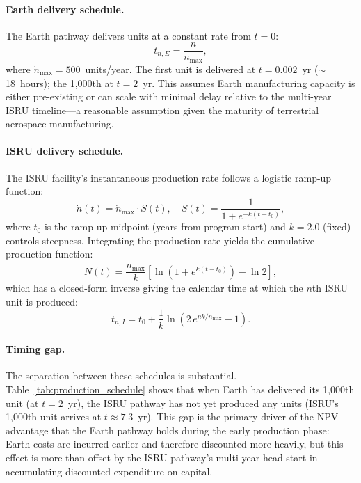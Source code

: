 \documentclass[preprint,12pt]{elsarticle}
\begin{document}
\paragraph{Earth delivery schedule.} The Earth pathway delivers units at a constant rate from $t = 0$:
\begin{equation}
  t_{n,E} = \frac{n}{\dot{n}_{\max}},
  \label{eq:earth_schedule}
\end{equation}
where $\dot{n}_{\max} = 500$~units/year. The first unit is delivered at $t = 0.002$~yr ($\sim$18~hours); the 1{,}000th at $t = 2$~yr. This assumes Earth manufacturing capacity is either pre-existing or can scale with minimal delay relative to the multi-year ISRU timeline---a reasonable assumption given the maturity of terrestrial aerospace manufacturing.

\paragraph{ISRU delivery schedule.} The ISRU facility's instantaneous production rate follows a logistic ramp-up function:
\begin{equation}
  \dot{n}(t) = \dot{n}_{\max} \cdot S(t), \quad S(t) = \frac{1}{1 + e^{-k(t - t_0)}},
  \label{eq:scurve}
\end{equation}
where $t_0$ is the ramp-up midpoint (years from program start) and $k = 2.0$ (fixed) controls steepness. Integrating the production rate yields the cumulative production function:
\begin{equation}
  N(t) = \frac{\dot{n}_{\max}}{k} \left[ \ln\!\left(1 + e^{k(t - t_0)}\right) - \ln 2 \right],
  \label{eq:cumulative_production}
\end{equation}
which has a closed-form inverse giving the calendar time at which the $n$th ISRU unit is produced:
\begin{equation}
  t_{n,I} = t_0 + \frac{1}{k} \ln\!\left(2\,e^{nk/\dot{n}_{\max}} - 1\right).
  \label{eq:production_schedule}
\end{equation}

\paragraph{Timing gap.} The separation between these schedules is substantial. Table~\ref{tab:production_schedule} shows that when Earth has delivered its 1{,}000th unit (at $t = 2$~yr), the ISRU pathway has not yet produced any units (ISRU's 1{,}000th unit arrives at $t \approx 7.3$~yr). This gap is the primary driver of the NPV advantage that the Earth pathway holds during the early production phase: Earth costs are incurred earlier and therefore discounted more heavily, but this effect is more than offset by the ISRU pathway's multi-year head start in accumulating discounted expenditure on capital.
\end{document}
